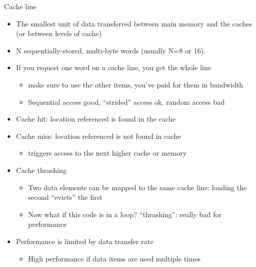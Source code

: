 \begin{frame}{Cache line}

  \begin{itemize}
  \item
    The smallest unit of data transferred between main memory and the
    caches (or between levels of cache)
  \item
    N sequentially-stored, multi-byte words (usually N=8 or 16).
  \item
    If you request one word on a cache line, you get the whole line

    \begin{itemize}
      \tightlist
    \item
      make sure to use the other items, you've paid for them in bandwidth
    \item
      Sequential access good, ``strided'' access ok, random access bad
    \end{itemize}
  \item
    Cache hit: location referenced is found in the cache
  \item
    Cache miss: location referenced is not found in cache

    \begin{itemize}
      \tightlist
    \item
      triggers access to the next higher cache or memory
    \end{itemize}
  \item
    Cache thrashing

    \begin{itemize}
      \tightlist
    \item
      Two data elements can be mapped to the same cache line: loading the
      second ``evicts'' the first
    \item
      Now what if this code is in a loop? ``thrashing'': really bad for
      performance
    \end{itemize}
  \item
    Performance is limited by data transfer rate

    \begin{itemize}
      \tightlist
    \item
      High performance if data items are used multiple times
    \end{itemize}
  \end{itemize}

\end{frame}

